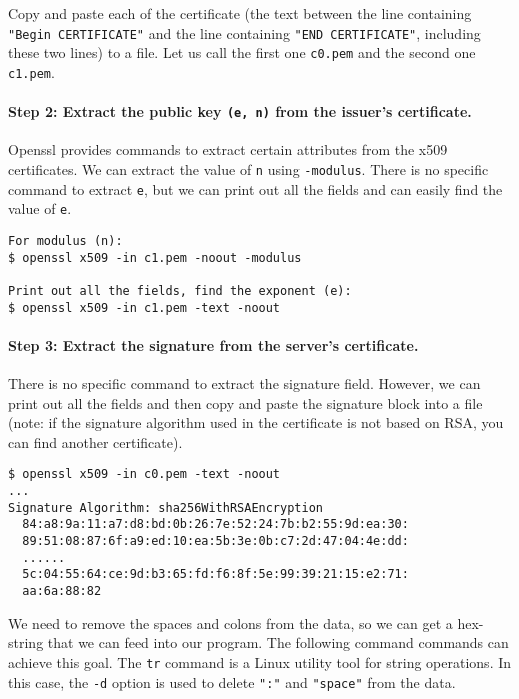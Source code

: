 Copy and paste each of the certificate (the text between the line
containing \texttt{"Begin CERTIFICATE"} and the line
containing \texttt{"END CERTIFICATE"}, including these two lines) to a file.
Let us call the first one \texttt{c0.pem} and
the second one \texttt{c1.pem}.



\paragraph{Step 2: Extract the public key \texttt{(e, n)} from the issuer's certificate.}
Openssl provides commands to extract certain attributes from the x509 certificates.
We can extract the value of \texttt{n} using \texttt{-modulus}. There is no specific
command to extract \texttt{e}, but we can print out all the fields and can easily
find the value of \texttt{e}.

\begin{lstlisting}
For modulus (n):
$ openssl x509 -in c1.pem -noout -modulus

Print out all the fields, find the exponent (e):
$ openssl x509 -in c1.pem -text -noout
\end{lstlisting}


\paragraph{Step 3: Extract the signature from the server's certificate.}
There is no specific \openssl command to extract the signature field.
However, we can print out all the fields and then copy and paste
the signature block into a file (note:
if the signature algorithm used in the certificate is not based on RSA,
you can find another certificate).


\begin{lstlisting}
$ openssl x509 -in c0.pem -text -noout
...
Signature Algorithm: sha256WithRSAEncryption
  84:a8:9a:11:a7:d8:bd:0b:26:7e:52:24:7b:b2:55:9d:ea:30:
  89:51:08:87:6f:a9:ed:10:ea:5b:3e:0b:c7:2d:47:04:4e:dd:
  ......
  5c:04:55:64:ce:9d:b3:65:fd:f6:8f:5e:99:39:21:15:e2:71:
  aa:6a:88:82
\end{lstlisting}

We need to remove the spaces and colons from the data, so we can get
a hex-string that we can feed into our program. The following command
commands can achieve this goal. The \texttt{tr} command is a Linux utility tool for
string operations. In this case, the \texttt{-d} option is used to delete \texttt{":"} and
\texttt{"space"} from the data.

